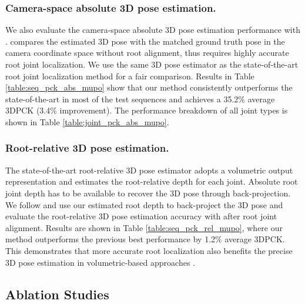 \documentclass[runningheads]{llncs}
\begin{document}
\subsubsection{Camera-space absolute 3D pose estimation.}
We also evaluate the camera-space absolute 3D pose estimation performance with .
 compares the estimated 3D pose with the matched ground truth pose in the camera coordinate space without root alignment, thus requires highly accurate root joint localization. We use the same 3D pose estimator \cite{sun2018integral} as the state-of-the-art root joint localization method \cite{Moon_2019_ICCV_3DMPPE} for a fair comparison. Results in Table \ref{table:seq_pck_abs_mupo} show that our method consistently outperforms the state-of-the-art in most of the test sequences and achieves a 35.2\% average 3DPCK (3.4\% improvement). The performance breakdown of all joint types is shown in Table \ref{table:joint_pck_abs_mupo}.

\subsubsection{Root-relative 3D pose estimation.}
The state-of-the-art root-relative 3D pose estimator \cite{sun2018integral} adopts a volumetric output representation and estimates the root-relative depth for each joint. 
Absolute root joint depth has to be available
to recover the 3D pose through back-projection. We follow \cite{Moon_2019_ICCV_3DMPPE} and use our estimated root depth to back-project the 3D pose and evaluate the root-relative 3D pose estimation accuracy with  after root joint alignment. Results are shown in Table \ref{table:seq_pck_rel_mupo}, where our method outperforms the previous best performance by 1.2\% average 3DPCK. This demonstrates that more accurate root localization also benefits the precise 3D pose estimation in volumetric-based approaches \cite{pavlakos2017coarse,sun2018integral,Moon_2019_ICCV_3DMPPE}.

\subsection{Ablation Studies}
\end{document}
